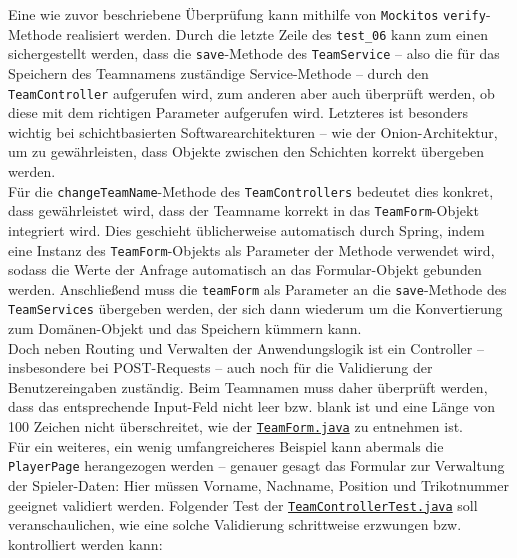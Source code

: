 Eine wie zuvor beschriebene Überprüfung kann mithilfe von \texttt{Mockitos} 
\texttt{verify}-Methode realisiert werden. Durch die letzte Zeile des 
\texttt{test\_06} kann zum einen sichergestellt werden, dass die 
\texttt{save}-Methode des \texttt{TeamService} -- also die für das Speichern des 
Teamnamens zuständige Service-Methode -- durch den \texttt{TeamController} 
aufgerufen wird, zum anderen aber auch überprüft werden, ob diese mit dem 
richtigen Parameter aufgerufen wird. Letzteres ist besonders wichtig bei 
schichtbasierten Softwarearchitekturen -- wie der Onion-Architektur, um zu 
gewährleisten, dass Objekte zwischen den Schichten korrekt übergeben werden. \\ 
Für die \texttt{changeTeamName}-Methode des \texttt{TeamControllers} bedeutet dies 
konkret, dass gewährleistet wird, dass der Teamname korrekt in das 
\texttt{TeamForm}-Objekt integriert wird. Dies geschieht üblicherweise automatisch 
durch Spring, indem eine Instanz des \texttt{TeamForm}-Objekts als Parameter der Methode 
verwendet wird, sodass die Werte der Anfrage automatisch an das Formular-Objekt gebunden 
werden. Anschließend muss die \texttt{teamForm} als Parameter an die \texttt{save}-Methode des \texttt{TeamServices} übergeben werden, der sich dann wiederum um die 
Konvertierung zum Domänen-Objekt und das Speichern kümmern kann. \\ 
Doch neben Routing und Verwalten der Anwendungslogik ist ein Controller -- 
insbesondere bei POST-Requests -- auch noch für die Validierung der 
Benutzereingaben zuständig. Beim Teamnamen muss daher überprüft werden, dass das 
entsprechende Input-Feld nicht leer bzw. blank ist und eine Länge von 100 Zeichen 
nicht überschreitet, wie der 
\href{https://github.com/FlorianOhmes/bat_spielzeitenplaner/blob/main/spielzeitenplaner/src/main/java/de/bathesis/spielzeitenplaner/web/forms/TeamForm.java}{\texttt{TeamForm.java}}
zu entnehmen ist. \\ 
Für ein weiteres, ein wenig umfangreicheres Beispiel kann abermals die 
\texttt{PlayerPage} herangezogen werden -- genauer gesagt das Formular zur Verwaltung der 
Spieler-Daten: Hier müssen Vorname, Nachname, Position und Trikotnummer geeignet 
validiert werden. Folgender Test der 
\href{https://github.com/FlorianOhmes/bat_spielzeitenplaner/blob/main/spielzeitenplaner/src/test/java/de/bathesis/spielzeitenplaner/web/TeamControllerTest.java}{\texttt{TeamControllerTest.java}}
soll veranschaulichen, wie eine solche Validierung schrittweise erzwungen bzw. 
kontrolliert werden kann: 

